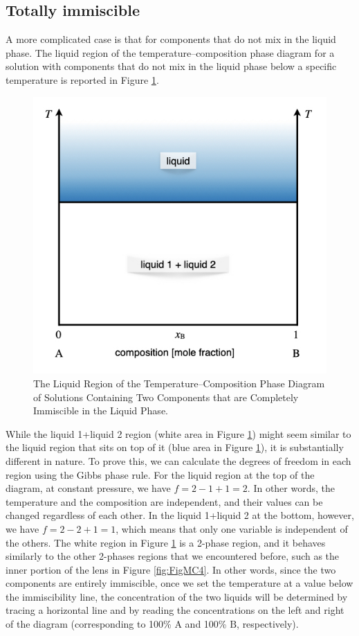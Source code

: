 \documentclass[
  9pt,
]{extbook}
\theoremstyle{definition}
\theoremstyle{definition}
\theoremstyle{definition}
\theoremstyle{remark}
\begin{document}
\hypertarget{totally-immiscible}{%
\subsection{Totally immiscible}\label{totally-immiscible}}

A more complicated case is that for components that do not mix in the liquid phase. The liquid region of the temperature--composition phase diagram for a solution with components that do not mix in the liquid phase below a specific temperature is reported in Figure \ref{fig:FigMC9}.

\begin{figure}

{\centering \includegraphics[width=0.6\linewidth]{./img/OEP_Figures.027} 

}

\caption{The Liquid Region of the Temperature–Composition Phase Diagram of Solutions Containing Two Components that are Completely Immiscible in the Liquid Phase.}\label{fig:FigMC9}
\end{figure}

While the liquid 1+liquid 2 region (white area in Figure \ref{fig:FigMC9}) might seem similar to the liquid region that sits on top of it (blue area in Figure \ref{fig:FigMC9}), it is substantially different in nature. To prove this, we can calculate the degrees of freedom in each region using the Gibbs phase rule. For the liquid region at the top of the diagram, at constant pressure, we have \(f=2-1+1=2\). In other words, the temperature and the composition are independent, and their values can be changed regardless of each other. In the liquid 1+liquid 2 at the bottom, however, we have \(f=2-2+1=1\), which means that only one variable is independent of the others. The white region in Figure \ref{fig:FigMC9} is a 2-phase region, and it behaves similarly to the other 2-phases regions that we encountered before, such as the inner portion of the lens in Figure \ref{fig:FigMC4}. In other words, since the two components are entirely immiscible, once we set the temperature at a value below the immiscibility line, the concentration of the two liquids will be determined by tracing a horizontal line and by reading the concentrations on the left and right of the diagram (corresponding to 100\% \(\mathrm{A}\) and 100\% \(\mathrm{B}\), respectively).
\end{document}
